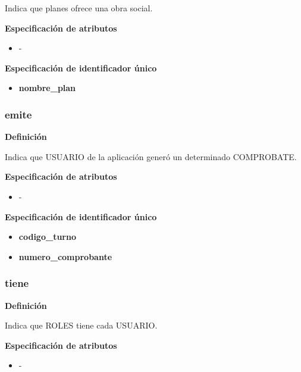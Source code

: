 \documentclass[a4paper,11pt]{article}
\begin{document}
Indica que planes ofrece una obra social.

\textbf{Especificación de atributos}

\begin{itemize}

    \item -

\end{itemize}

\textbf{Especificación de identificador único}

\begin{itemize}

    \item \textbf{nombre\_plan}

\end{itemize}


\subsubsection{\textbf{emite}}

\textbf{Definición}

Indica que USUARIO de la aplicación generó un determinado COMPROBATE.

\textbf{Especificación de atributos}

\begin{itemize}

    \item -

\end{itemize}

\textbf{Especificación de identificador único}

\begin{itemize}

    \item \textbf{codigo\_turno}

    \item \textbf{numero\_comprobante}

\end{itemize}

\subsubsection{\textbf{tiene}}

\textbf{Definición}

Indica que ROLES tiene cada USUARIO.

\textbf{Especificación de atributos}

\begin{itemize}

    \item -

\end{itemize}
\end{document}
